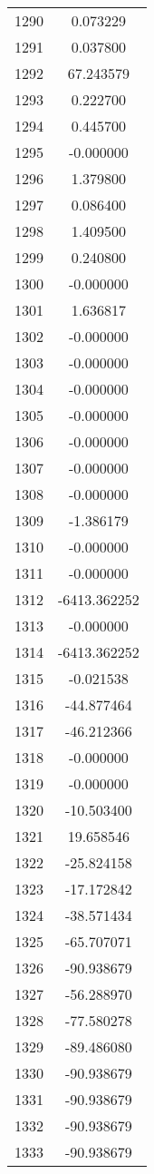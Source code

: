 \documentclass[12pt]{article}
\begin{document}
\begin{longtable}{@{}cc@{}}
1290 & 0.073229 \\
1291 & 0.037800 \\
1292 & 67.243579 \\
1293 & 0.222700 \\
1294 & 0.445700 \\
1295 & -0.000000 \\
1296 & 1.379800 \\
1297 & 0.086400 \\
1298 & 1.409500 \\
1299 & 0.240800 \\
1300 & -0.000000 \\
1301 & 1.636817 \\
1302 & -0.000000 \\
1303 & -0.000000 \\
1304 & -0.000000 \\
1305 & -0.000000 \\
1306 & -0.000000 \\
1307 & -0.000000 \\
1308 & -0.000000 \\
1309 & -1.386179 \\
1310 & -0.000000 \\
1311 & -0.000000 \\
1312 & -6413.362252 \\
1313 & -0.000000 \\
1314 & -6413.362252 \\
1315 & -0.021538 \\
1316 & -44.877464 \\
1317 & -46.212366 \\
1318 & -0.000000 \\
1319 & -0.000000 \\
1320 & -10.503400 \\
1321 & 19.658546 \\
1322 & -25.824158 \\
1323 & -17.172842 \\
1324 & -38.571434 \\
1325 & -65.707071 \\
1326 & -90.938679 \\
1327 & -56.288970 \\
1328 & -77.580278 \\
1329 & -89.486080 \\
1330 & -90.938679 \\
1331 & -90.938679 \\
1332 & -90.938679 \\
1333 & -90.938679 \\

\end{longtable}
\end{document}
